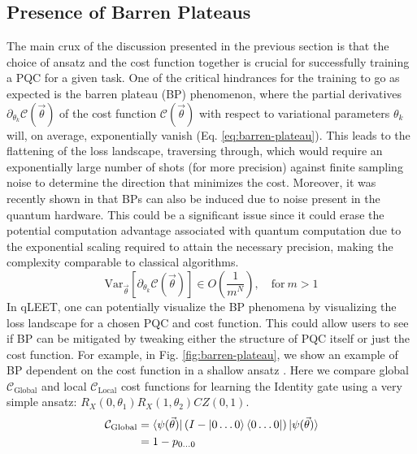 \vspace{-2pt}

\subsection{Presence of Barren Plateaus}

The main crux of the discussion presented in the previous section is that the choice of ansatz and the cost function together is crucial for successfully training a PQC for a given task. One of the critical hindrances for the training to go as expected is the barren plateau (BP) phenomenon, where the partial derivatives $\partial_{\theta_k}\mathcal{C}(\vec{\theta})$ of the cost function $\mathcal{C}(\vec{\theta})$ with respect to variational parameters $\theta_k$ will, on average, exponentially vanish (Eq. \ref{eq:barren-plateau}). This leads to the flattening of the loss landscape, traversing through, which would require an exponentially large number of shots (for more precision) against finite sampling noise to determine the direction that minimizes the cost. Moreover, it was recently shown in \cite{2020arXiv200714384W} that BPs can also be induced due to noise present in the quantum hardware. This could be a significant issue since it could erase the potential computation advantage associated with quantum computation due to the exponential scaling required to attain the necessary precision, making the complexity comparable to classical algorithms.
\begin{equation}\label{eq:barren-plateau}
	\text{Var}_{\vec{\theta}}[\partial_{\theta_k}\mathcal{C}(\vec{\theta})] \in O\left(\frac{1}{m^N}\right),\quad \text{for}\ m > 1
\end{equation}
In qLEET, one can potentially visualize the BP phenomena by visualizing the loss landscape for a chosen PQC and cost function. This could allow users to see if BP can be mitigated by tweaking either the structure of PQC itself or just the cost function. For example, in Fig. \ref{fig:barren-plateau}, we show an example of BP dependent on the cost function in a shallow ansatz \cite{s41467-021-21728-w}. Here we compare global $\mathcal{C}_{\text{Global}}$ and local $\mathcal{C}_{\text{Local}}$ cost functions for learning the Identity gate using a very simple ansatz: $R_X(0,\theta_1)R_X(1, \theta_2)CZ(0, 1)$. 
\begin{equation}
\begin{split}
    \mathcal{C}_{\text{Global}} &= \bra{\psi(\vec{\theta})} (I - \ket{0\ldots0}\bra{0\ldots0}) \ket{\psi(\vec{\theta})} \\
    &= 1 - p_{0\ldots0}
\end{split}
\end{equation}
